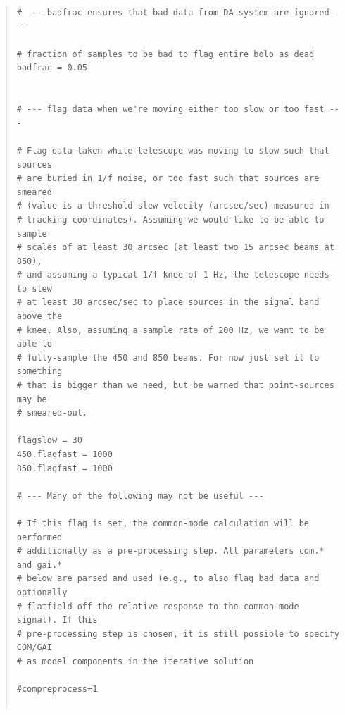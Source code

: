 \documentclass[twoside,11pt]{article}
\renewcommand{\_}{\texttt{\symbol{95}}}
\newenvironment{myquote}{\begin{quote}\begin{small}}{\end{small}\end{quote}}
\begin{document}
\begin{myquote}
\begin{verbatim}
# --- badfrac ensures that bad data from DA system are ignored ---

# fraction of samples to be bad to flag entire bolo as dead
badfrac = 0.05


# --- flag data when we're moving either too slow or too fast ---

# Flag data taken while telescope was moving to slow such that sources
# are buried in 1/f noise, or too fast such that sources are smeared
# (value is a threshold slew velocity (arcsec/sec) measured in
# tracking coordinates). Assuming we would like to be able to sample
# scales of at least 30 arcsec (at least two 15 arcsec beams at 850),
# and assuming a typical 1/f knee of 1 Hz, the telescope needs to slew
# at least 30 arcsec/sec to place sources in the signal band above the
# knee. Also, assuming a sample rate of 200 Hz, we want to be able to
# fully-sample the 450 and 850 beams. For now just set it to something
# that is bigger than we need, but be warned that point-sources may be
# smeared-out.

flagslow = 30
450.flagfast = 1000
850.flagfast = 1000

# --- Many of the following may not be useful ---

# If this flag is set, the common-mode calculation will be performed
# additionally as a pre-processing step. All parameters com.* and gai.*
# below are parsed and used (e.g., to also flag bad data and optionally
# flatfield off the relative response to the common-mode signal). If this
# pre-processing step is chosen, it is still possible to specify COM/GAI
# as model components in the iterative solution

#compreprocess=1


\end{verbatim}
\end{myquote}
\end{document}
